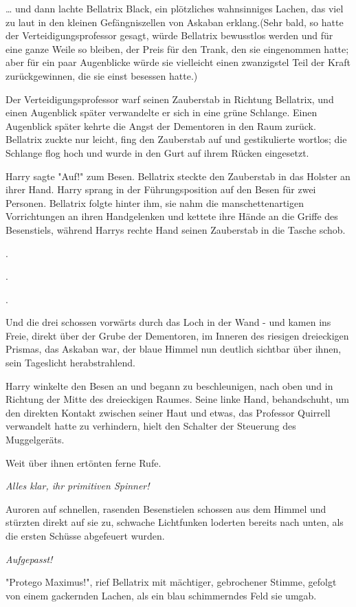 {… und dann lachte Bellatrix Black, ein plötzliches wahnsinniges Lachen, das viel zu laut in den kleinen Gefängniszellen von Askaban erklang.(Sehr bald, so hatte der Verteidigungsprofessor gesagt, würde Bellatrix bewusstlos werden und für eine ganze Weile so bleiben, der Preis für den Trank, den sie eingenommen hatte; aber für ein paar Augenblicke würde sie vielleicht einen zwanzigstel Teil der Kraft zurückgewinnen, die sie einst besessen hatte.)

Der Verteidigungsprofessor warf seinen Zauberstab in Richtung Bellatrix, und einen Augenblick später verwandelte er sich in eine grüne Schlange. Einen Augenblick später kehrte die Angst der Dementoren in den Raum zurück. Bellatrix zuckte nur leicht, fing den Zauberstab auf und gestikulierte wortlos; die Schlange flog hoch und wurde in den Gurt auf ihrem Rücken eingesetzt.

Harry sagte "Auf!" zum Besen. Bellatrix steckte den Zauberstab in das Holster an ihrer Hand. Harry sprang in der Führungsposition auf den Besen für zwei Personen. Bellatrix folgte hinter ihm, sie nahm die manschettenartigen Vorrichtungen an ihren Handgelenken und kettete ihre Hände an die Griffe des Besenstiels, während Harrys rechte Hand seinen Zauberstab in die Tasche schob.

.

.

.

Und die drei schossen vorwärts durch das Loch in der Wand - und kamen ins Freie, direkt über der Grube der Dementoren, im Inneren des riesigen dreieckigen Prismas, das Askaban war, der blaue Himmel nun deutlich sichtbar über ihnen, sein Tageslicht herabstrahlend.

Harry winkelte den Besen an und begann zu beschleunigen, nach oben und in Richtung der Mitte des dreieckigen Raumes. Seine linke Hand, behandschuht, um den direkten Kontakt zwischen seiner Haut und etwas, das Professor Quirrell verwandelt hatte zu verhindern, hielt den Schalter der Steuerung des Muggelgeräts.

Weit über ihnen ertönten ferne Rufe.

\emph{Alles klar, ihr primitiven Spinner!}

Auroren auf schnellen, rasenden Besenstielen schossen aus dem Himmel und stürzten direkt auf sie zu, schwache Lichtfunken loderten bereits nach unten, als die ersten Schüsse abgefeuert wurden.

\emph{Aufgepasst!}

"Protego Maximus!", rief Bellatrix mit mächtiger, gebrochener Stimme, gefolgt von einem gackernden Lachen, als ein blau schimmerndes Feld sie umgab.

}
